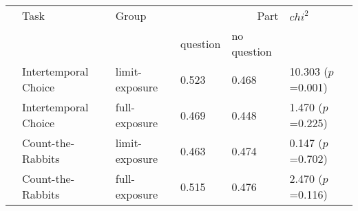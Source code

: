 \begin{tabular}{llllll}
\hline
 & Task & Group & \multicolumn{2}{r}{Part} & $chi^2$ \\
 &  &  & question & no question &  \\
\hline
 & Intertemporal Choice & limit-exposure & 0.523 & 0.468 & 10.303 ($p$=0.001) \\
 & Intertemporal Choice & full-exposure & 0.469 & 0.448 & 1.470 ($p$=0.225) \\
 & Count-the-Rabbits & limit-exposure & 0.463 & 0.474 & 0.147 ($p$=0.702) \\
 & Count-the-Rabbits & full-exposure & 0.515 & 0.476 & 2.470 ($p$=0.116) \\
\hline
\end{tabular}\hline

